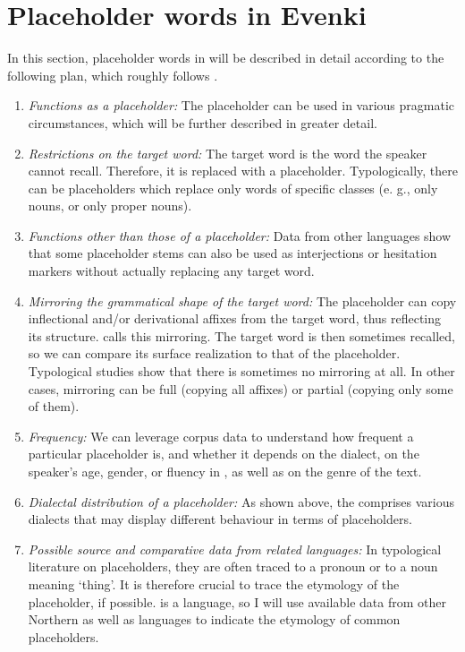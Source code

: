 \documentclass[output=paper,colorlinks,citecolor=brown]{langscibook}
\begin{document}
\section{Placeholder words in Evenki}

In this section, placeholder words in  will be described in detail according to the following plan, which roughly follows \citet{Podlesskaya2010}.

\begin{enumerate}
    \item \textit{Functions as a placeholder:} The placeholder can be used in various pragmatic circumstances, which will be further described in greater detail.

    \item \textit{Restrictions on the target word:} The target word is the word the speaker cannot recall. Therefore, it is replaced with a placeholder. Typologically, there can be placeholders which replace only words of specific classes (e. g., only nouns, or only proper nouns).

    \item \textit{Functions other than those of a placeholder:} Data from other languages show that some placeholder stems can also be used as interjections or hesitation markers without actually replacing any target word.

    \item \textit{Mirroring the grammatical shape of the target word:} The placeholder can copy inflectional and/or derivational affixes from the target word, thus reflecting its structure. \citet{Podlesskaya2010} calls this mirroring. The target word is then sometimes recalled, so we can compare its surface realization to that of the placeholder. Typological studies show that there is sometimes no mirroring at all. In other cases, mirroring can be full (copying all affixes) or partial (copying only some of them).
    
    \item \textit{Frequency:} We can leverage corpus data to understand how frequent a particular placeholder is, and whether it depends on the dialect, on the speaker’s age, gender, or fluency in , as well as on the genre of the text.
    
    \item \textit{Dialectal distribution of a placeholder:} As shown above, the  comprises various dialects that may display different behaviour in terms of placeholders.
    
    \item \textit{Possible source and comparative data from related languages:} In typological literature on placeholders, they are often traced to a pronoun or to a noun meaning ‘thing’. It is therefore crucial to trace the etymology of the placeholder, if possible.  is a  language, so I will use available data from other Northern as well as  languages to indicate the etymology of common placeholders.
\end{enumerate}
\end{document}
